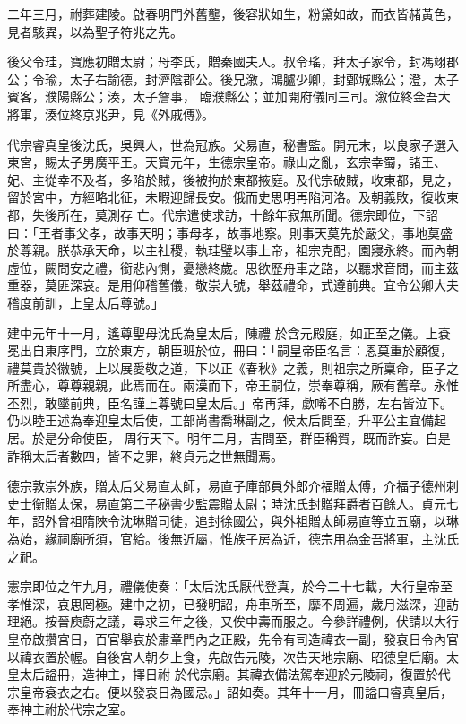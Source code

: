 \begin{pinyinscope}
 二年三月，祔葬建陵。啟春明門外舊壟，後容狀如生，粉黛如故，而衣皆赭黃色，見者駭異，以為聖子符兆之先。



 後父令珪，寶應初贈太尉；母李氏，贈秦國夫人。叔令瑤，拜太子家令，封馮翊郡公；令瑜，太子右諭德，封濟陰郡公。後兄漵，鴻臚少卿，封鄄城縣公；澄，太子賓客，濮陽縣公；湊，太子詹事，
 臨濮縣公；並加開府儀同三司。漵位終金吾大將軍，湊位終京兆尹，見《外戚傳》。



 代宗睿真皇後沈氏，吳興人，世為冠族。父易直，秘書監。開元末，以良家子選入東宮，賜太子男廣平王。天寶元年，生德宗皇帝。祿山之亂，玄宗幸蜀，諸王、妃、主從幸不及者，多陷於賊，後被拘於東都掖庭。及代宗破賊，收東都，見之，留於宮中，方經略北征，未暇迎歸長安。俄而史思明再陷河洛。及朝義敗，復收東都，失後所在，莫測存
 亡。代宗遣使求訪，十餘年寂無所聞。德宗即位，下詔曰：「王者事父孝，故事天明；事母孝，故事地察。則事天莫先於嚴父，事地莫盛於尊親。朕恭承天命，以主社稷，執珪璧以事上帝，祖宗克配，園寢永終。而內朝虛位，闕問安之禮，銜悲內惻，憂戀終歲。思欲歷舟車之路，以聽求音問，而主茲重器，莫匪深哀。是用仰稽舊儀，敬崇大號，舉茲禮命，式遵前典。宜令公卿大夫稽度前訓，上皇太后尊號。」



 建中元年十一月，遙尊聖母沈氏為皇太后，陳禮
 於含元殿庭，如正至之儀。上袞冕出自東序門，立於東方，朝臣班於位，冊曰：「嗣皇帝臣名言：恩莫重於顧復，禮莫貴於徽號，上以展愛敬之道，下以正《春秋》之義，則祖宗之所稟命，臣子之所盡心，尊尊親親，此焉而在。兩漢而下，帝王嗣位，崇奉尊稱，厥有舊章。永惟丕烈，敢墜前典，臣名謹上尊號曰皇太后。」帝再拜，歔唏不自勝，左右皆泣下。仍以睦王述為奉迎皇太后使，工部尚書喬琳副之，候太后問至，升平公主宜備起居。於是分命使臣，
 周行天下。明年二月，吉問至，群臣稱賀，既而詐妄。自是詐稱太后者數四，皆不之罪，終貞元之世無聞焉。



 德宗敦崇外族，贈太后父易直太師，易直子庫部員外郎介福贈太傅，介福子德州刺史士衡贈太保，易直第二子秘書少監震贈太尉；時沈氏封贈拜爵者百餘人。貞元七年，詔外曾祖隋陜令沈琳贈司徒，追封徐國公，與外祖贈太師易直等立五廟，以琳為始，緣祠廟所須，官給。後無近屬，惟族子房為近，德宗用為金吾將軍，主沈氏
 之祀。



 憲宗即位之年九月，禮儀使奏：「太后沈氏厭代登真，於今二十七載，大行皇帝至孝惟深，哀思罔極。建中之初，已發明詔，舟車所至，靡不周遍，歲月滋深，迎訪理絕。按晉庾蔚之議，尋求三年之後，又俟中壽而服之。今參詳禮例，伏請以大行皇帝啟攢宮日，百官舉哀於肅章門內之正殿，先令有司造禕衣一副，發哀日令內官以禕衣置於幄。自後宮人朝夕上食，先啟告元陵，次告天地宗廟、昭德皇后廟。太皇太后謚冊，造神主，擇日祔
 於代宗廟。其禕衣備法駕奉迎於元陵祠，復置於代宗皇帝袞衣之右。便以發哀日為國忌。」詔如奏。其年十一月，冊謚曰睿真皇后，奉神主祔於代宗之室。




\end{pinyinscope}

